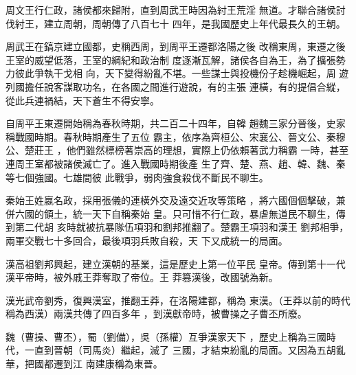 \documentclass[avery5371,grid]{flashcards}
\begin{document}
{周文王行仁政，諸侯都來歸附，直到周武王時因為紂王荒淫
無道。才聯合諸侯討伐紂王，建立周朝，周朝傳了八百七十
四年，是我國歷史上年代最長久的王朝。} %
{} %

{周武王在鎬京建立國都，史稱西周，到周平王遷都洛陽之後
改稱東周，東遷之後王室的威望低落，王室的綱紀和政治制
度逐漸瓦解，諸侯各自為王，為了擴張勢力彼此爭執干戈相
向，天下變得紛亂不堪。一些謀士與投機份子趁機崛起，周
遊列國擔任說客謀取功名，在各國之間進行遊說，有的主張
連橫，有的提倡合縱，從此兵連禍結，天下蒼生不得安寧。} %
{} %

{自周平王東遷開始稱為春秋時期，共二百二十四年，自韓
趙魏三家分晉後，史家稱戰國時期。春秋時期產生了五位
霸主，依序為齊桓公、宋襄公、晉文公、秦穆公、楚莊王
，他們雖然標榜著崇高的理想，實際上仍依賴著武力稱霸
一時，甚至連周王室都被諸侯滅亡了。進入戰國時期後產
生了齊、楚、燕、趙、韓、魏、秦等七個強國。七雄間彼
此戰爭，弱肉強食殺伐不斷民不聊生。} %
{} %

{秦始王姓嬴名政，採用張儀的連橫外交及遠交近攻等策略
，將六國個個擊破，兼併六國的領土，統一天下自稱秦始
皇。只可惜不行仁政，暴虐無道民不聊生，傳到第二代胡
亥時就被抗暴隊伍項羽和劉邦推翻了。楚霸王項羽和漢王
劉邦相爭，兩軍交戰七十多回合，最後項羽兵敗自殺，天
下又成統一的局面。} %
{} %


{漢高祖劉邦興起，建立漢朝的基業，這是歷史上第一位平民
皇帝。傳到第十一代漢平帝時，被外戚王莽奪取了帝位。王
莽篡漢後，改國號為新。} %
{} %

{漢光武帝劉秀，復興漢室，推翻王莽，在洛陽建都，稱為
東漢。（王莽以前的時代稱為西漢）兩漢共傳了四百多年
，到漢獻帝時，被曹操之子曹丕所廢。} %
{} %

{魏（曹操、曹丕），蜀（劉備），吳（孫權）互爭漢家天下
，歷史上稱為三國時代，一直到晉朝（司馬炎）繼起，滅了
三國，才結束紛亂的局面。又因為五胡亂華，把國都遷到江
南建康稱為東晉。} %
{} %
\end{document}
